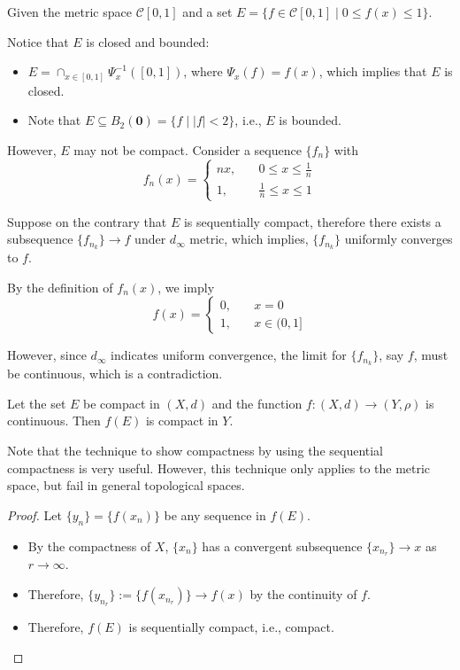 \begin{example}
Given the metric space $\mathcal{C}[0,1]$ and a set $E=\{f\in\mathcal{C}[0,1]\mid0\le f(x)\le 1\}$.

Notice that $E$ is closed and bounded:
\begin{itemize}
\item
$E=\cap_{x\in[0,1]}\Psi_x^{-1}([0,1])$, where $\Psi_x(f)=f(x)$, which implies that $E$ is closed.
\item
Note that $E\subseteq B_2(\bm0)=\{f\mid |f|<2\}$, i.e., $E$ is bounded.
\end{itemize}

However, $E$ may not be compact. Consider a sequence $\{f_n\}$ with
\[
f_n(x)=\left\{
\begin{aligned}
nx,&\quad0\le x\le\frac{1}{n}\\
1,&\quad\frac{1}{n}\le x\le 1
\end{aligned}
\right.
\]

Suppose on the contrary that $E$ is sequentially compact, therefore there exists a subsequence $\{f_{n_k}\}\to f$ under $d_\infty$ metric, which implies, $\{f_{n_k}\}$ uniformly converges to $f$.

By the definition of $f_n(x)$, we imply
\[
f(x)=\left\{
\begin{aligned}
0,&\quad x=0\\
1,&\quad x\in(0,1]
\end{aligned}
\right.
\]

However, since $d_\infty$ indicates uniform convergence, the limit for $\{f_{n_k}\}$, say $f$, must be continuous, which is a contradiction.

\end{example}



\begin{theorem}\label{The:2:7}
Let the set $E$ be compact in $(X,d)$ and the function $f:(X,d)\to (Y,\rho)$ is continuous. Then $f(E)$ is compact in $Y$.
\end{theorem}

Note that the technique to show compactness by using the sequential compactness is very useful. However, this technique only applies to the metric space, but fail in general topological spaces.
\begin{proof}
Let $\{y_n\}=\{f(x_n)\}$ be any sequence in $f(E)$.
\begin{itemize}
\item
By the compactness of $X$, $\{x_n\}$ has a convergent subsequence $\{x_{n_r}\}\to x$ as $r\to\infty$.
\item
Therefore, $\{y_{n_r}\}:=\{f(x_{n_r})\}\to f(x)$ by the continuity of $f$.
\item
Therefore, $f(E)$ is sequentially compact, i.e., compact.
\end{itemize}
\end{proof}

